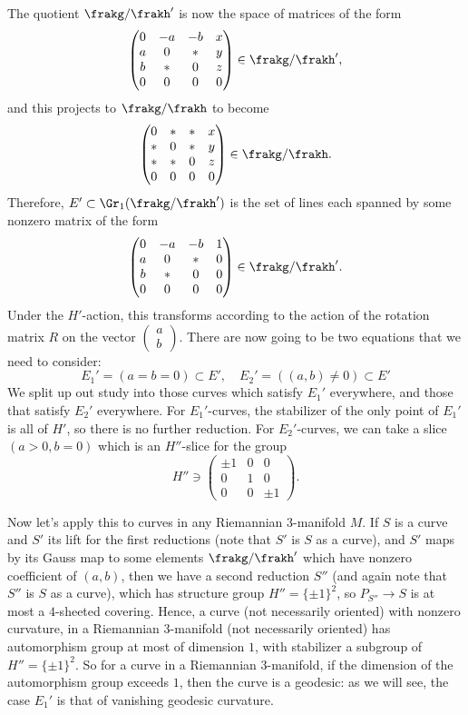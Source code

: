 The quotient $\frakg\slash\frakh'$ is now the space of matrices of the form 
\[\begin{pmatrix}
    0 & -a & -b & x \\
    a & 0 & \ast & y\\
    b & \ast & 0 & z\\
    0 & 0 & 0 & 0
\end{pmatrix}\in\frakg\slash\frakh',\]
and this projects to $\frakg\slash\frakh$ to become 
\[\begin{pmatrix}
    0 & \ast & \ast & x \\
    \ast & 0 & \ast & y\\
    \ast & \ast & 0 & z\\
    0 & 0 & 0 & 0
\end{pmatrix}\in\frakg\slash\frakh.\]
Therefore, $E'\subset \Gr_1(\frakg\slash\frakh')$ is the set of lines each spanned by some nonzero matrix of the form 
\[\begin{pmatrix}
    0 & -a & -b & 1 \\
    a & 0 & \ast & 0\\
    b & \ast & 0 & 0\\
    0 & 0 & 0 & 0
\end{pmatrix}\in\frakg\slash\frakh'.\]
Under the $H'$-action, this transforms according to the action of the rotation matrix $R$ on the vector $\left(\begin{smallmatrix}
    a\\b
\end{smallmatrix}\right)$. There are now going to be two equations that we need to consider:
\[E_1'=(a=b=0)\subset E',\quad E_2'=((a,b)\neq 0)\subset E'\]
We split up out study into those curves which satisfy $E_1'$ everywhere, and those that satisfy $E_2'$ everywhere. For $E_1'$-curves, the stabilizer of the only point of $E_1'$ is all of $H'$, so there is no further reduction. For $E_2'$-curves, we can take a slice $(a>0,b=0)$ which is an $H''$-slice for the group 
\[H''\ni \begin{pmatrix}
    \pm 1 & 0 & 0\\
    0 & 1 & 0\\
    0 & 0 & \pm 1
\end{pmatrix}.\]

Now let's apply this to curves in any Riemannian $3$-manifold $M$. If $S$ is a curve and $S'$ its lift for the first reductions (note that $S'$ is $S$ as a curve), and $S'$ maps by its Gauss map to some elements $\frakg\slash\frakh'$ which have nonzero coefficient of $(a,b)$, then we have a second reduction $S''$ (and again note that $S''$ is $S$ as a curve), which has structure group $H''=\{\pm 1\}^2$, so $P_{S''}\to S$ is at most a $4$-sheeted covering. Hence, a curve (not necessarily oriented) with nonzero curvature, in a Riemannian $3$-manifold (not necessarily oriented) has automorphism group at most of dimension $1$, with stabilizer a subgroup of $H''=\{\pm 1\}^2$. So for a curve in a Riemannian $3$-manifold, if the dimension of the automorphism group exceeds $1$, then the curve is a geodesic: as we will see, the case $E_1'$ is that of vanishing geodesic curvature.

